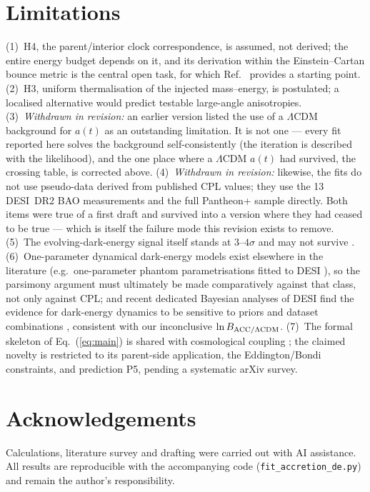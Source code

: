 \documentclass[11pt]{article}
\begin{document}
\section{Limitations}
\label{sec:limits}
(1)~H4, the parent/interior clock correspondence, is assumed, not derived; the entire energy budget depends on it, and its derivation within the Einstein--Cartan bounce metric is the central open task, for which Ref.~\cite{Poplawski2024} provides a starting point. (2)~H3, uniform thermalisation of the injected mass--energy, is postulated; a localised alternative would predict testable large-angle anisotropies. (3)~\emph{Withdrawn in revision:} an earlier version listed the use of a $\Lambda$CDM background for $a(t)$ as an outstanding limitation. It is not one --- every fit reported here solves the background self-consistently (the iteration is described with the likelihood), and the one place where a $\Lambda$CDM $a(t)$ had survived, the crossing table, is corrected above. (4)~\emph{Withdrawn in revision:} likewise, the fits do not use pseudo-data derived from published CPL values; they use the 13 DESI~DR2 BAO measurements and the full Pantheon+ sample directly. Both items were true of a first draft and survived into a version where they had ceased to be true --- which is itself the failure mode this revision exists to remove. (5)~The evolving-dark-energy signal itself stands at $3$--$4\sigma$ and may not survive \cite{DESI2025}. (6)~One-parameter dynamical dark-energy models exist elsewhere in the literature (e.g.\ one-parameter phantom parametrisations fitted to DESI \cite{Fikri2024}), so the parsimony argument must ultimately be made comparatively against that class, not only against CPL; and recent dedicated Bayesian analyses of DESI find the evidence for dark-energy dynamics to be sensitive to priors and dataset combinations \cite{Ong2025}, consistent with our inconclusive $\ln B_{\rm ACC/\Lambda CDM}$. (7)~The formal skeleton of Eq.~(\ref{eq:main}) is shared with cosmological coupling \cite{CrokerWeiner2019}; the claimed novelty is restricted to its parent-side application, the Eddington/Bondi constraints, and prediction P5, pending a systematic arXiv survey.

\section*{Acknowledgements}
Calculations, literature survey and drafting were carried out with AI assistance. All results are reproducible with the accompanying code (\texttt{fit\_accretion\_de.py}) and remain the author's responsibility.
\end{document}
